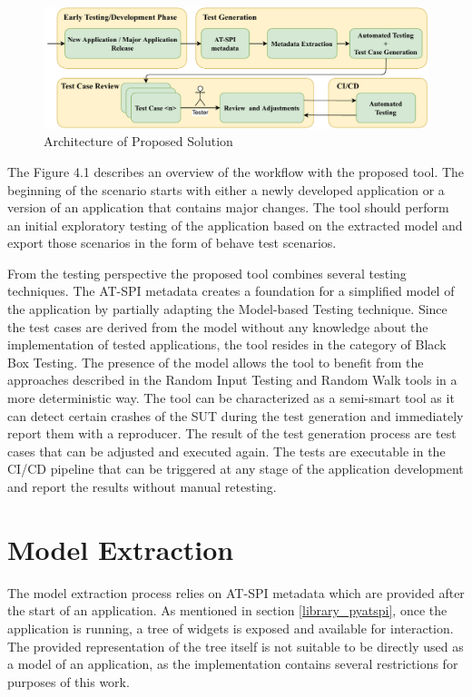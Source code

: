 \begin{figure}[hbt]
	\centering
	\includegraphics[width=1\textwidth]{obrazky-figures/overview.pdf}
	\caption{Architecture of Proposed Solution}
	\label{Diagram}
\end{figure}

The Figure 4.1 describes an overview of the workflow with the proposed tool. The beginning of the scenario starts with either a newly developed application or a version of an application that contains major changes. The tool should perform an initial exploratory testing of the application based on the extracted model and export those scenarios in the form of behave test scenarios.

From the testing perspective the proposed tool combines several testing techniques. The AT-SPI metadata creates a foundation for a simplified model of the application by partially adapting the Model-based Testing technique. Since the test cases are derived from the model without any knowledge about the implementation of tested applications, the tool resides in the category of Black Box Testing. The presence of the model allows the tool to benefit from the approaches described in the Random Input Testing and Random Walk tools in a more deterministic way. The tool can be characterized as a semi-smart tool as it can detect certain crashes of the SUT during the test generation and immediately report them with a reproducer. The result of the test generation process are test cases that can be adjusted and executed again. The tests are executable in the CI/CD pipeline that can be triggered at any stage of the application development and report the results without manual retesting.

\section{Model Extraction}
The model extraction process relies on AT-SPI metadata which are provided after the start of an application. As mentioned in section \ref{library_pyatspi}, once the application is running, a tree of widgets is exposed and available for interaction. The provided representation of the tree itself is not suitable to be directly used as a model of an application, as the implementation contains several restrictions for purposes of this work.

